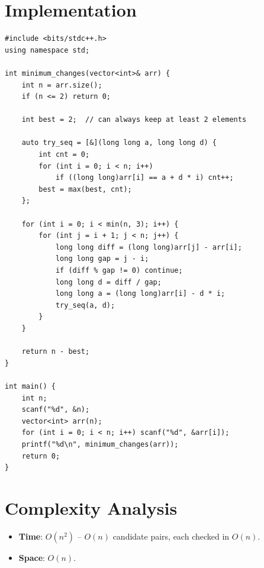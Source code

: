 \documentclass[11pt,a4paper]{article}
\begin{document}
\section{Implementation}

\begin{lstlisting}
#include <bits/stdc++.h>
using namespace std;

int minimum_changes(vector<int>& arr) {
    int n = arr.size();
    if (n <= 2) return 0;

    int best = 2;  // can always keep at least 2 elements

    auto try_seq = [&](long long a, long long d) {
        int cnt = 0;
        for (int i = 0; i < n; i++)
            if ((long long)arr[i] == a + d * i) cnt++;
        best = max(best, cnt);
    };

    for (int i = 0; i < min(n, 3); i++) {
        for (int j = i + 1; j < n; j++) {
            long long diff = (long long)arr[j] - arr[i];
            long long gap = j - i;
            if (diff % gap != 0) continue;
            long long d = diff / gap;
            long long a = (long long)arr[i] - d * i;
            try_seq(a, d);
        }
    }

    return n - best;
}

int main() {
    int n;
    scanf("%d", &n);
    vector<int> arr(n);
    for (int i = 0; i < n; i++) scanf("%d", &arr[i]);
    printf("%d\n", minimum_changes(arr));
    return 0;
}
\end{lstlisting}

\section{Complexity Analysis}
\begin{itemize}
  \item \textbf{Time}: $O(n^2)$ -- $O(n)$ candidate pairs, each checked in $O(n)$.
  \item \textbf{Space}: $O(n)$.
\end{itemize}
\end{document}
